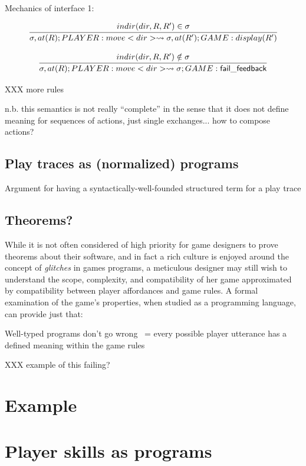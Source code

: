 \documentclass[sigconf]{acmart}
\begin{document}
  Mechanics of interface 1:

  \[
    \infer{
      \sigma, at(R); PLAYER: move<dir> \stepsto \sigma, at(R'); GAME:
      display(R')
    }
    {
      indir(dir, R, R') \in \sigma
    }
  \]


  \[
    \infer{
      \sigma, at(R); PLAYER: move<dir> \stepsto 
      \sigma; GAME: \mathsf{fail\_feedback}
    }
    {
      indir(dir, R, R') \notin \sigma
    }
  \]

  XXX more rules

  n.b. this semantics is not really ``complete'' in the sense that it does
  not define meaning for sequences of actions, just single exchanges... how
  to compose actions?

  \subsection{Play traces as (normalized) programs}
  
  Argument for having a syntactically-well-founded structured term for a
  play trace

  \subsection{Theorems?}

  While it is not often considered of high priority for game designers to
  prove theorems about their software, and in fact a rich culture is
  enjoyed around the concept of {\em glitches} in games programs, a
  meticulous designer may still wish to understand the scope, complexity,
  and compatibility of her game approximated by compatibility between 
  player affordances and game rules. A formal examination of the game's
  properties, when studied as a programming language, can provide just
  that:

  Well-typed programs don't go wrong ~= every possible player utterance has
  a defined meaning within the game rules

  XXX example of this failing?
  
\section{Example}


\section{Player skills as programs}
\end{document}
